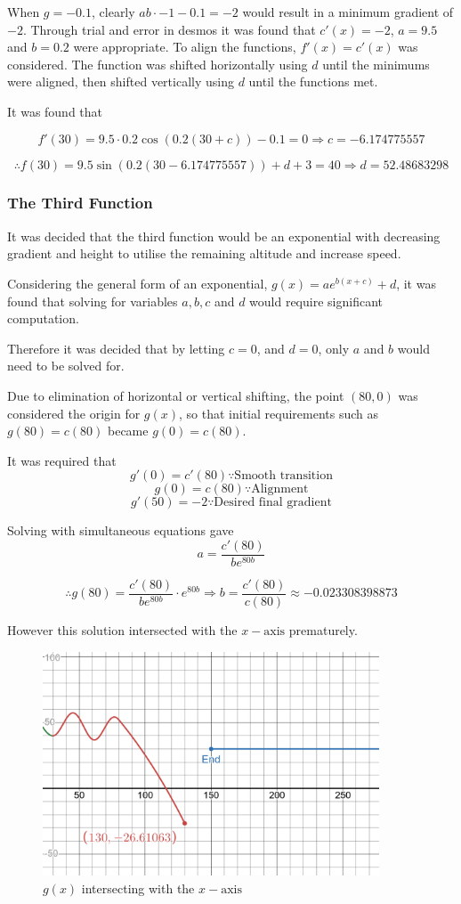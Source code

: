 \documentclass[11pt, letterpaper]{article}
\begin{document}
When $g=-0.1$, clearly $ab\cdot -1-0.1=-2$ would result in a minimum gradient of $-2$. Through trial and error in desmos it was found that $c'(x)=-2$, $a=9.5$ and $b=0.2$ were appropriate. To align the functions, $f'(x)=c'(x)$ was considered. The function was shifted horizontally using $d$ until the minimums were aligned, then shifted vertically using $d$ until the functions met.  

It was found  that

 $$f'(30)=9.5\cdot0.2\cos (0.2(30+c))-0.1=0 \Rightarrow c=-6.174775557$$

$$\therefore f(30)=9.5\sin(0.2(30-6.174775557))+d+3=40 \Rightarrow d=52.48683298$$

\subsubsection{The Third Function}
It was decided that the third function would be an exponential with decreasing gradient and height to utilise the remaining altitude and increase speed.

Considering the general form of an exponential, $g(x)=ae^{b(x+c)}+d$, it was found that solving for variables $a, b, c$ and $d$ would require significant computation.

Therefore it was decided that by letting $c=0$, and $d=0$, only $a$ and $b$ would need to be solved for. 

Due to elimination of horizontal or vertical shifting, the point $(80, 0)$ was considered the origin for $g(x)$, so that  initial requirements such as $g(80)=c(80)$ became $g(0)=c(80)$. 

It was required that 
$$g'(0)=c'(80) \because \textrm{Smooth transition}$$
$$g(0)=c(80)\because \textrm{Alignment}$$ 
$$g'(50)=-2\because \textrm{Desired final gradient}$$

Solving with simultaneous equations gave 
$$a=\frac{c'(80)}{be^{80b}}$$ 

$$\therefore g(80)=\frac{c'(80)}{be^{80b}}\cdot e^{80b}\Rightarrow b=\frac{c'(80)}{c(80)}\approx -0.023308398873$$

However this solution intersected with the $x-\textrm{axis}$ prematurely. 
	\begin{figure}[h]
		\centering
		\includegraphics[width=10cm]{PrematureIntersecion.png}
		\caption{$g(x)$ intersecting with the $x-\textrm{axis}$}
	\end{figure}
\end{document}
